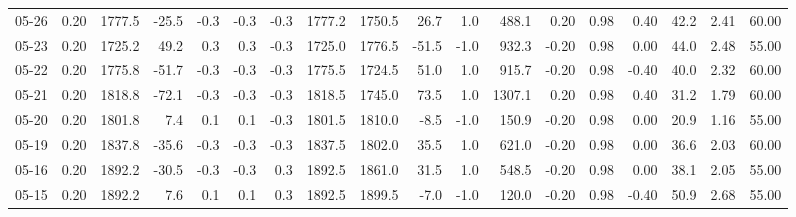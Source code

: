 \begin{threeparttable}
{\begin{tabular}{lrrrrrrrrrrrrrrrrr}
  05-26 &     0.20 & 1777.5 &             -25.5 &              -0.3 &               -0.3 &               -0.3 & 1777.2 & 1750.5 &       26.7 &                      1.0 &               488.1 &       0.20 &      0.98 &           0.40 &             42.2 &            2.41 &                  60.00 \\
  05-23 &     0.20 & 1725.2 &              49.2 &               0.3 &                0.3 &               -0.3 & 1725.0 & 1776.5 &      -51.5 &                     -1.0 &               932.3 &      -0.20 &      0.98 &           0.00 &             44.0 &            2.48 &                  55.00 \\
  05-22 &     0.20 & 1775.8 &             -51.7 &              -0.3 &               -0.3 &               -0.3 & 1775.5 & 1724.5 &       51.0 &                      1.0 &               915.7 &      -0.20 &      0.98 &          -0.40 &             40.0 &            2.32 &                  60.00 \\
  05-21 &     0.20 & 1818.8 &             -72.1 &              -0.3 &               -0.3 &               -0.3 & 1818.5 & 1745.0 &       73.5 &                      1.0 &              1307.1 &       0.20 &      0.98 &           0.40 &             31.2 &            1.79 &                  60.00 \\
  05-20 &     0.20 & 1801.8 &               7.4 &               0.1 &                0.1 &               -0.3 & 1801.5 & 1810.0 &       -8.5 &                     -1.0 &               150.9 &      -0.20 &      0.98 &           0.00 &             20.9 &            1.16 &                  55.00 \\
  05-19 &     0.20 & 1837.8 &             -35.6 &              -0.3 &               -0.3 &               -0.3 & 1837.5 & 1802.0 &       35.5 &                      1.0 &               621.0 &      -0.20 &      0.98 &           0.00 &             36.6 &            2.03 &                  60.00 \\
  05-16 &     0.20 & 1892.2 &             -30.5 &              -0.3 &               -0.3 &                0.3 & 1892.5 & 1861.0 &       31.5 &                      1.0 &               548.5 &      -0.20 &      0.98 &           0.00 &             38.1 &            2.05 &                  55.00 \\
  05-15 &     0.20 & 1892.2 &               7.6 &               0.1 &                0.1 &                0.3 & 1892.5 & 1899.5 &       -7.0 &                     -1.0 &               120.0 &      -0.20 &      0.98 &          -0.40 &             50.9 &            2.68 &                  55.00 \\

\end{tabular}}
\end{threeparttable}
